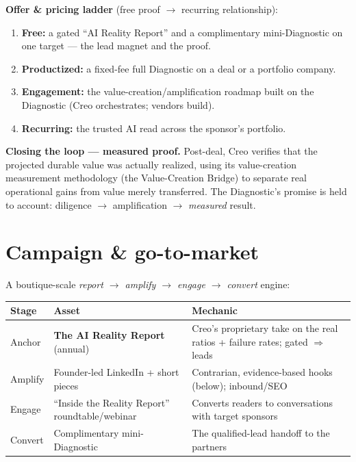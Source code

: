 \documentclass[11pt]{article}
\begin{document}
\textbf{Offer \& pricing ladder} (free proof $\to$ recurring relationship):
\begin{enumerate}
  \item \textbf{Free:} a gated ``AI Reality Report'' and a complimentary mini-Diagnostic on one
  target --- the lead magnet and the proof.
  \item \textbf{Productized:} a fixed-fee full Diagnostic on a deal or a portfolio company.
  \item \textbf{Engagement:} the value-creation/amplification roadmap built on the Diagnostic
  (Creo orchestrates; vendors build).
  \item \textbf{Recurring:} the trusted AI read across the sponsor's portfolio.
\end{enumerate}

\textbf{Closing the loop --- measured proof.} Post-deal, Creo verifies that the projected
durable value was actually realized, using its value-creation measurement methodology (the
Value-Creation Bridge) to separate real operational gains from value merely transferred. The
Diagnostic's promise is held to account: diligence $\rightarrow$ amplification $\rightarrow$
\emph{measured} result.

\section{Campaign \& go-to-market}
A boutique-scale \emph{report $\rightarrow$ amplify $\rightarrow$ engage $\rightarrow$ convert}
engine:

\begin{center}
\renewcommand{\arraystretch}{1.25}\small
\begin{tabular}{p{1.8cm} p{4.6cm} p{5.8cm}}
\toprule
\textbf{Stage} & \textbf{Asset} & \textbf{Mechanic} \\
\midrule
Anchor & \textbf{The AI Reality Report} (annual) & Creo's proprietary take on the real ratios + failure rates; gated $\Rightarrow$ leads \\
Amplify & Founder-led LinkedIn + short pieces & Contrarian, evidence-based hooks (below); inbound/SEO \\
Engage & ``Inside the Reality Report'' roundtable/webinar & Converts readers to conversations with target sponsors \\
Convert & Complimentary mini-Diagnostic & The qualified-lead handoff to the partners \\
\bottomrule
\end{tabular}
\end{center}
\end{document}
